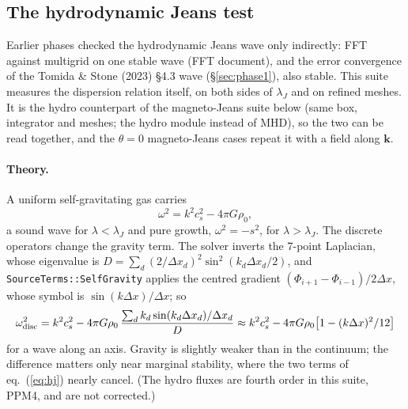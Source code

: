 \documentclass[11pt]{article}
\newcommand{\code}[1]{\texttt{#1}}
\begin{document}
\subsection{The hydrodynamic Jeans test}
\label{sec:hj}

Earlier phases checked the hydrodynamic Jeans wave only indirectly: FFT against multigrid on
one stable wave (FFT document), and the error convergence of the Tomida \& Stone (2023)
\S4.3 wave (\S\ref{sec:phase1}), also stable. This suite measures the dispersion relation
itself, on both sides of $\lambda_J$ and on refined meshes. It is the hydro counterpart of the
magneto-Jeans suite below (same box, integrator and meshes; the hydro module instead of
MHD), so the two can be read together, and the $\theta = 0$ magneto-Jeans cases repeat it with
a field along $\mathbf k$.

\paragraph{Theory.} A uniform self-gravitating gas carries
\begin{equation}
  \omega^2 = k^2c_s^2 - 4\pi G\rho_0 ,
  \label{eq:hj}
\end{equation}
a sound wave for $\lambda < \lambda_J$ and pure growth, $\omega^2 = -s^2$, for
$\lambda > \lambda_J$. The discrete operators change the gravity term. The solver inverts the
7-point Laplacian, whose eigenvalue is
$D = \sum_d (2/\Delta x_d)^2 \sin^2(k_d\Delta x_d/2)$, and
\code{SourceTerms::SelfGravity} applies the centred gradient
$(\Phi_{i+1}-\Phi_{i-1})/2\Delta x$, whose symbol is $\sin(k\Delta x)/\Delta x$; so
\begin{equation}
  \omega^2_{\rm disc} = k^2c_s^2 - 4\pi G\rho_0\,
  \frac{\sum_d k_d \sin(k_d\Delta x_d)/\Delta x_d}{D}
  \approx k^2c_s^2 - 4\pi G\rho_0\bigl[1 - (k\Delta x)^2/12\bigr]
  \label{eq:hjdisc}
\end{equation}
for a wave along an axis. Gravity is slightly weaker than in the continuum; the difference
matters only near marginal stability, where the two terms of eq.~(\ref{eq:hj}) nearly cancel.
(The hydro fluxes are fourth order in this suite, PPM4, and are not corrected.)
\end{document}
